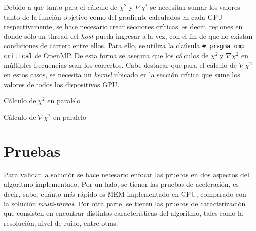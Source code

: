 Debido a que tanto para el cálculo de $\chi^{2}$ y $\nabla \chi^{2}$ se necesitan sumar los valores tanto de la función objetivo como del gradiente calculados en cada GPU respectivamente, se hace necesario crear  secciones críticas, es decir, regiones en donde sólo un thread del \textit{host} pueda ingresar a la vez, con el fin de que no existan condiciones de carrera entre ellos. Para ello, se utiliza la claúsula \texttt{\# pragma omp critical} de OpenMP. De esta forma se asegura que los cálculos de $\chi^{2}$ y $\nabla \chi^{2}$ en múltiples frecuencias sean los correctos. Cabe destacar que para el cálculo de $\nabla \chi^{2}$ en estos casos, se necesita un \textit{kernel} ubicado en la sección crítica que sume los valores de todos los dispositivos GPU.


\renewcommand{\algorithmicdo}{\textbf{do in parallel}}

\begin{algorithm}
	\begin{algorithmic}[1]
    \ENDFOR
	\end{algorithmic}
	\caption{Cálculo de $\chi^{2}$ en paralelo}
	\label{alg:chi2openmp}
\end{algorithm}

\begin{algorithm}
	\begin{algorithmic}[1]
    \ENDFOR
	\end{algorithmic}
	\caption{Cálculo de $\nabla \chi^{2}$ en paralelo}
	\label{alg:chi2openmp}
\end{algorithm}

\renewcommand{\algorithmicdo}{\textbf{do}}



\chapter{Pruebas}
\label{cap:pruebas}

Para validar la solución se hace necesario enfocar las pruebas en dos aspectos del algoritmo implementado. Por un lado, se tienen las pruebas de aceleración, es decir, saber cuánto más rápido es MEM implementado en GPU, comparado con la solución \textit{multi-thread}. Por otra parte, se tienen las pruebas de caracterización que consisten en encontrar distintas características del algoritmo, tales como la resolución, nivel de ruido, entre otras.

